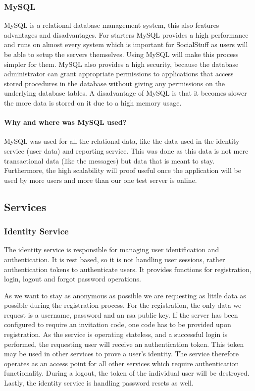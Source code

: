 \subsubsection{MySQL}
MySQL is a relational database management system, this also features advantages and disadvantages.
For starters MySQL provides a high performance and runs on almost every system which is important for SocialStuff as
users will be able to setup the servers themselves.
Using MySQL will make this process simpler for them.
MySQL also provides a high security, because the database administrator can grant appropriate permissions to
applications that access stored procedures in the database without giving any permissions on the underlying database
tables.
A disadvantage of MySQL is that it becomes slower the more data is stored on it due to a high memory usage.

\paragraph{Why and where was MySQL used?}
MySQL was used for all the relational data, like the data used in the identity service (user data) and reporting
service.
This was done as this data is not mere transactional data (like the messages) but data that is meant to stay.
Furthermore, the high scalability will proof useful once the application will be used by more users and more than our
one test server is online.

\subsection{Services}\label{subsec:services2}

\subsubsection{Identity Service}\label{subsubsec:identitySer}
The identity service is responsible for managing user identification and authentication.
It is \ac{rest} based, so it is not handling user sessions, rather authentication tokens to authenticate users.
It provides functions for registration, login, logout and forgot password operations.

As we want to stay as anonymous as possible we are requesting as little data as possible during the registration
process.
For the registration, the only data we request is a username, password and an \ac{rsa} public key.
If the server has been configured to require an invitation code, one code has to be provided upon registration.
As the service is operating stateless, and a successful login is performed, the requesting user will receive an
authentication token.
This token may be used in other services to prove a user's identity.
The service therefore operates as an access point for all other services which require authentication functionality.
During a logout, the token of the individual user will be destroyed.
Lastly, the identity service is handling password resets as well.

